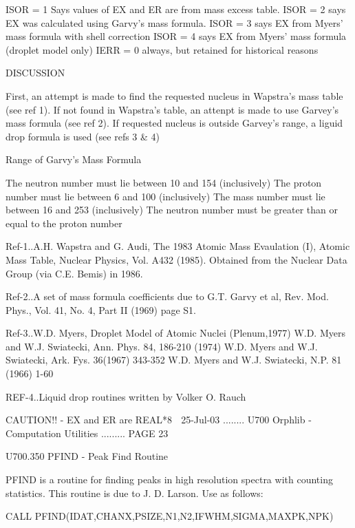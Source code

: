    ISOR = 1 Says values of EX and ER are from mass excess table.
   ISOR = 2 says EX was calculated using Garvy's mass formula.
   ISOR = 3 says EX from Myers' mass formula with shell correction
   ISOR = 4 says EX from Myers' mass formula (droplet model only)
   IERR = 0 always, but retained for historical reasons
 
                                   DISCUSSION
 
   First,  an  attempt is made to find the requested nucleus in Wapstra's mass
   table (see ref 1). If not found in Wapstra's table, an attenpt is  made  to
   use  Garvey's  mass  formula  (see  ref 2). If requested nucleus is outside
   Garvey's range, a liguid drop formula is used (see refs 3 & 4)
 
                          Range of Garvy's Mass Formula
 
   The neutron number must lie between 10 and 154 (inclusively)
   The proton  number must lie between  6 and 100 (inclusively)
   The mass    number must lie between 16 and 253 (inclusively)
   The neutron number must be greater than or equal to the proton number
 
   Ref-1..A.H. Wapstra and G. Audi,  The  1983  Atomic  Mass  Evaulation  (I),
          Atomic  Mass Table, Nuclear Physics, Vol. A432 (1985). Obtained from
          the Nuclear Data Group (via C.E. Bemis) in 1986.
 
   Ref-2..A set of mass formula coefficients due to G.T.  Garvy  et  al,  Rev.
          Mod. Phys., Vol. 41, No. 4, Part II (1969) page S1.
 
   Ref-3..W.D. Myers, Droplet Model of Atomic Nuclei (Plenum,1977)
          W.D. Myers and W.J. Swiatecki, Ann. Phys. 84, 186-210 (1974)
          W.D. Myers and W.J. Swiatecki, Ark. Fys. 36(1967) 343-352
          W.D. Myers and W.J. Swiatecki, N.P. 81 (1966) 1-60
 
   REF-4..Liquid drop routines written by Volker O. Rauch
 
 
                        CAUTION!! - EX and ER are REAL*8
    
   25-Jul-03 ........ U700  Orphlib - Computation Utilities ......... PAGE  23
 
 
   U700.350  PFIND - Peak Find Routine
 
   PFIND  is  a  routine  for  finding  peaks  in high resolution spectra with
   counting statistics. This routine is due to J. D. Larson. Use as follows:
 
          CALL PFIND(IDAT,CHANX,PSIZE,N1,N2,IFWHM,SIGMA,MAXPK,NPK)
 
